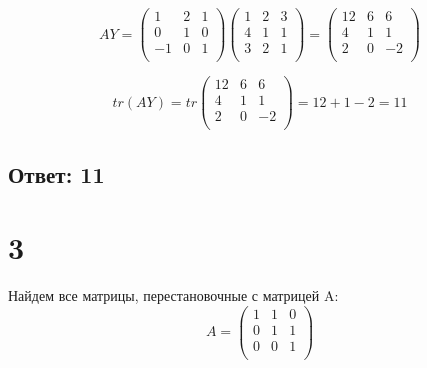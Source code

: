 \documentclass[a4paper]{article}
\begin{document}
\begin{equation*}
AY = 
\begin{pmatrix}
1 &2&1\\
0&1&0\\
-1&0&1\\
\end{pmatrix}  
\begin{pmatrix}
1 &2&3\\
4&1&1\\
3&2&1\\
\end{pmatrix} = 
\begin{pmatrix}
12 &6&6\\
4&1&1\\
2&0&-2\\
\end{pmatrix}   
\end{equation*}

\begin{equation*}
tr(AY) = tr
\begin{pmatrix}
12 &6&6\\
4&1&1\\
2&0&-2\\
\end{pmatrix}   = 12 +1 -2 = 11
\end{equation*}
\subsection*{Ответ: 11}


\section*{3}
Найдем все матрицы, перестановочные с матрицей A:
\begin{equation*}
A = 
\begin{pmatrix}
1 &1&0\\
0&1&1\\
0&0&1\\
\end{pmatrix}
\end{equation*}
\end{document}
